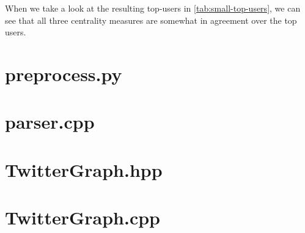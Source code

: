 \documentclass[a4paper,10pt,hidelinks]{article}
\begin{document}
When we take a look at the resulting top-users in \autoref{tab:small-top-users}, we can see that all three centrality measures are somewhat in agreement over the top users.

\pagebreak

\appendix

\section{preprocess.py}
\label{lst:preprocess}

\pagebreak


\section{parser.cpp}



\pagebreak

\section{TwitterGraph.hpp}



\pagebreak

\section{TwitterGraph.cpp}



\pagebreak
\end{document}

